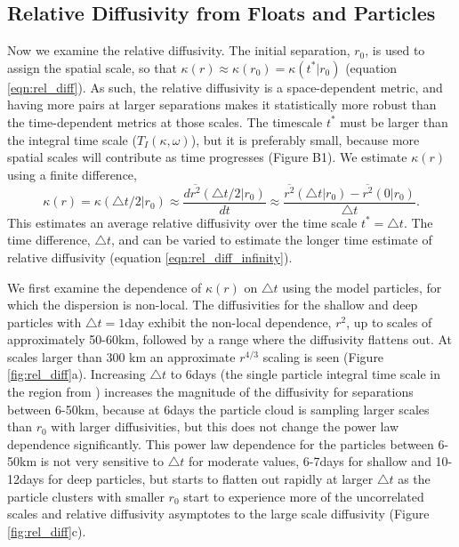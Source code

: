 \documentclass[]{ametsoc}
\begin{document}
\subsection{Relative Diffusivity from Floats and Particles}
Now we examine the relative diffusivity. The initial separation, $r_0$, is used to assign the spatial scale, so that $\kappa(r) \approx \kappa(r_0) = \kappa(t^*|r_0)$ (equation \ref{eqn:rel_diff}). As such, the relative diffusivity is a space-dependent metric, and having more pairs at larger separations makes it statistically more robust than the time-dependent metrics at those scales. The timescale $t^*$ must be larger than the integral time scale ($T_I(\kappa, \omega)$), but it is preferably small, because more spatial scales will contribute as time progresses (Figure B1). We estimate $\kappa (r)$ using a finite difference,
\begin{equation}
    \kappa (r) = \kappa (\triangle t/2|r_0) \approx \frac{d \overline{r^2}(\triangle t/2|r_0)}{dt} \approx \frac{ \overline{r^2}(\triangle t|r_0) - \overline{r^2}(0|r_0)}{\triangle t}.
\end{equation}
This estimates an average relative diffusivity over the time scale $t^* = \triangle t$. The time difference, $\triangle t$, and can be varied to estimate the longer time estimate of relative diffusivity (equation \ref{eqn:rel_diff_infinity}).

We first examine the dependence of $\kappa(r)$ on $\triangle t$ using the model particles, for which the dispersion is non-local. The diffusivities for the shallow and deep particles with $\triangle t = 1$day exhibit the non-local dependence, $r^2$, up to scales of approximately 50-60km, followed by a range where the diffusivity flattens out. At scales larger than 300 km an approximate $r^{4/3}$ scaling is seen (Figure \ref{fig:rel_diff}a). %
Increasing $\triangle t$ to 6days (the single particle integral time scale in the region from \citet{balwada2016b}) increases the magnitude of the diffusivity for separations between 6-50km, because at 6days the particle cloud is sampling larger scales than $r_0$ with larger diffusivities, but this does not change the power law dependence significantly. This power law dependence for the particles between 6-50km is not very sensitive to $\triangle t$ for moderate values, 6-7days for shallow and 10-12days for deep particles, but starts to flatten out rapidly at larger $\triangle t$ as the particle clusters with smaller $r_0$ start to experience more of the uncorrelated scales and relative diffusivity asymptotes to the large scale diffusivity (Figure \ref{fig:rel_diff}c). 
\end{document}
